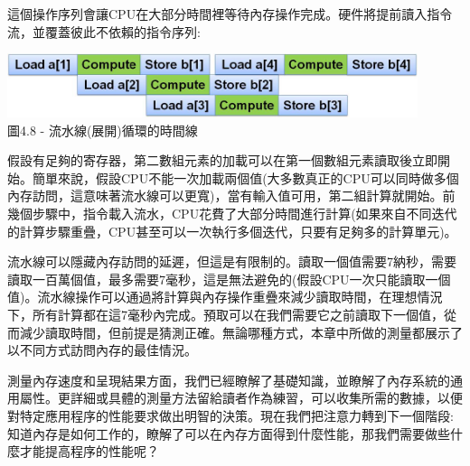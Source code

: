 這個操作序列會讓CPU在大部分時間裡等待內存操作完成。硬件將提前讀入指令流，並覆蓋彼此不依賴的指令序列:

\begin{center}
\includegraphics[width=0.9\textwidth]{content/1/chapter4/images/8.jpg}\\
圖4.8 - 流水線(展開)循環的時間線
\end{center}

假設有足夠的寄存器，第二數組元素的加載可以在第一個數組元素讀取後立即開始。簡單來說，假設CPU不能一次加載兩個值(大多數真正的CPU可以同時做多個內存訪問，這意味著流水線可以更寬)，當有輸入值可用，第二組計算就開始。前幾個步驟中，指令載入流水，CPU花費了大部分時間進行計算(如果來自不同迭代的計算步驟重疊，CPU甚至可以一次執行多個迭代，只要有足夠多的計算單元)。

流水線可以隱藏內存訪問的延遲，但這是有限制的。讀取一個值需要7納秒，需要讀取一百萬個值，最多需要7毫秒，這是無法避免的(假設CPU一次只能讀取一個值)。流水線操作可以通過將計算與內存操作重疊來減少讀取時間，在理想情況下，所有計算都在這7毫秒內完成。預取可以在我們需要它之前讀取下一個值，從而減少讀取時間，但前提是猜測正確。無論哪種方式，本章中所做的測量都展示了以不同方式訪問內存的最佳情況。

測量內存速度和呈現結果方面，我們已經瞭解了基礎知識，並瞭解了內存系統的通用屬性。更詳細或具體的測量方法留給讀者作為練習，可以收集所需的數據，以便對特定應用程序的性能要求做出明智的決策。現在我們把注意力轉到下一個階段:知道內存是如何工作的，瞭解了可以在內存方面得到什麼性能，那我們需要做些什麼才能提高程序的性能呢？
















